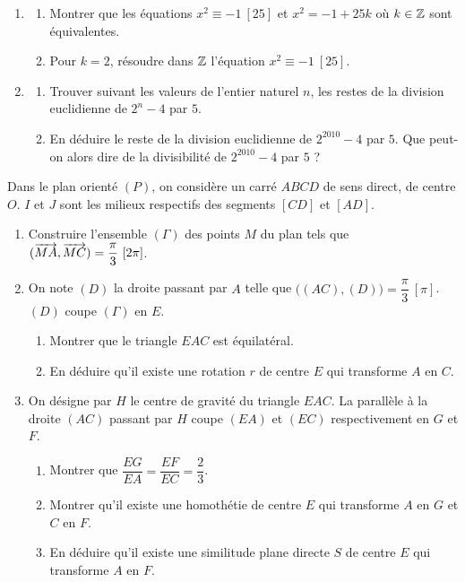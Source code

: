 \documentclass[11pt]{article}
\begin{document}


\begin{enumerate}
  \item \begin{enumerate}[label=\alph*.]
    \item Montrer que les équations $x^2 \equiv -1\ [25]$ et $x^2 = -1 + 25k$ où $k \in \mathbb{Z}$ sont équivalentes.
    \item Pour $k = 2$, résoudre dans $\mathbb{Z}$ l'équation $x^2 \equiv -1\ [25]$.
  \end{enumerate}
  \item \begin{enumerate}[label=\alph*.]
    \item Trouver suivant les valeurs de l'entier naturel $n$, les restes de la division euclidienne de $2^n - 4$ par $5$.
    \item En déduire le reste de la division euclidienne de $2^{2010} - 4$ par $5$. Que peut-on alors dire de la divisibilité de $2^{2010} - 4$ par $5$ ?
  \end{enumerate}
\end{enumerate}


Dans le plan orienté $(P)$, on considère un carré $ABCD$ de sens direct, de centre $O$. $I$ et $J$ sont les milieux respectifs des segments $[CD]$ et $[AD]$.

\begin{enumerate}
  \item Construire l'ensemble $(\Gamma)$ des points $M$ du plan tels que $(\overrightarrow{MA}, \overrightarrow{MC}) = \dfrac{\pi}{3}\ [2\pi]$.
  \item On note $(D)$ la droite passant par $A$ telle que $\big((AC),(D)\big) = \dfrac{\pi}{3}\ [\pi]$. $(D)$ coupe $(\Gamma)$ en $E$.
  \begin{enumerate}[label=\alph*.]
    \item Montrer que le triangle $EAC$ est équilatéral.
    \item En déduire qu'il existe une rotation $r$ de centre $E$ qui transforme $A$ en $C$.
  \end{enumerate}
  \item On désigne par $H$ le centre de gravité du triangle $EAC$. La parallèle à la droite $(AC)$ passant par $H$ coupe $(EA)$ et $(EC)$ respectivement en $G$ et $F$.
  \begin{enumerate}[label=\alph*.]
    \item Montrer que $\dfrac{EG}{EA} = \dfrac{EF}{EC} = \dfrac{2}{3}$.
    \item Montrer qu'il existe une homothétie de centre $E$ qui transforme $A$ en $G$ et $C$ en $F$.
    \item En déduire qu'il existe une similitude plane directe $S$ de centre $E$ qui transforme $A$ en $F$.
  \end{enumerate}
\end{enumerate}
\end{document}
